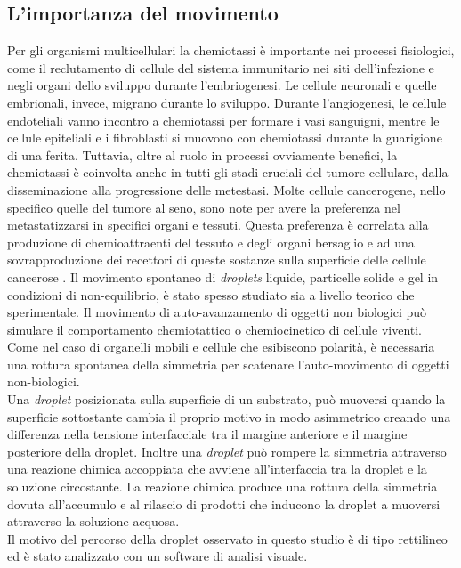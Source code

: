 \subsection{L'importanza del movimento}
\label{sec:00456}
Per gli organismi multicellulari la chemiotassi è importante nei processi fisiologici, come il reclutamento di cellule del sistema immunitario nei siti dell'infezione e negli organi dello sviluppo durante l'embriogenesi.\cite{cellMig} Le cellule neuronali e quelle embrionali, invece, migrano durante lo sviluppo. Durante l'angiogenesi, le cellule endoteliali vanno incontro a chemiotassi per formare i vasi sanguigni, mentre le cellule epiteliali e i fibroblasti si muovono con chemiotassi durante la guarigione di una ferita.\cite{move1} Tuttavia, oltre al ruolo in processi ovviamente benefici, la chemiotassi è coinvolta anche in tutti gli stadi cruciali del tumore cellulare, dalla disseminazione alla progressione delle metestasi. Molte cellule cancerogene, nello specifico quelle del tumore al seno, sono note per avere la preferenza nel metastatizzarsi in specifici organi e tessuti. Questa preferenza è correlata alla produzione di chemioattraenti del tessuto e degli organi bersaglio e ad una sovrapproduzione dei recettori di queste sostanze sulla superficie delle cellule cancerose \cite{chemocancer}.
Il movimento spontaneo di \emph{droplets} liquide, particelle solide e gel in condizioni di non-equilibrio, è stato spesso studiato sia a livello teorico che sperimentale. Il movimento di auto-avanzamento di oggetti non biologici può simulare il comportamento chemiotattico o chemiocinetico di cellule viventi.
Come nel caso di organelli mobili e cellule che esibiscono polarità, è necessaria una rottura spontanea della simmetria per scatenare l'auto-movimento di oggetti non-biologici. 
\\Una \emph{droplet} posizionata sulla superficie di un substrato, può muoversi quando la superficie sottostante cambia il proprio motivo in modo asimmetrico creando una differenza nella tensione interfacciale tra il margine anteriore e il margine posteriore della droplet. Inoltre una \emph{droplet} può rompere la simmetria attraverso una reazione chimica accoppiata che avviene all'interfaccia tra la droplet e la soluzione circostante. La reazione chimica produce una rottura della simmetria dovuta all'accumulo e al rilascio di prodotti che inducono la droplet a muoversi attraverso la soluzione acquosa.\cite{selfpropelled}
\\Il motivo del percorso della droplet osservato in questo studio è di tipo rettilineo ed è stato analizzato con un software di analisi visuale. 

